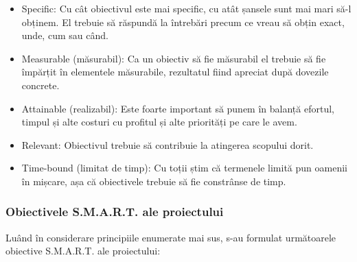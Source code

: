 \documentclass[12pt,a4paper,twoside]{report}
\begin{document}
\begin{itemize}
	\item Specific: Cu cât obiectivul este mai specific, cu atât șansele sunt mai mari să-l obținem. El trebuie să răspundă la întrebări precum ce vreau să obțin exact, unde, cum sau când.
	\item Measurable (măsurabil): Ca un obiectiv să fie măsurabil el trebuie să fie împărțit în elementele măsurabile, rezultatul fiind apreciat după dovezile concrete.
	\item Attainable (realizabil): Este foarte important să punem în balanță efortul, timpul și alte costuri cu profitul și alte priorități pe care le avem.
	\item Relevant: Obiectivul trebuie să contribuie la atingerea scopului dorit.
	\item Time-bound (limitat de timp): Cu toții știm că termenele limită pun oamenii în mișcare, așa că obiectivele trebuie să fie constrânse de timp.
\end{itemize}

\subsubsection{Obiectivele S.M.A.R.T. ale proiectului}
Luând în considerare principiile enumerate mai sus, s-au formulat următoarele obiective S.M.A.R.T. ale proiectului:
\end{document}
